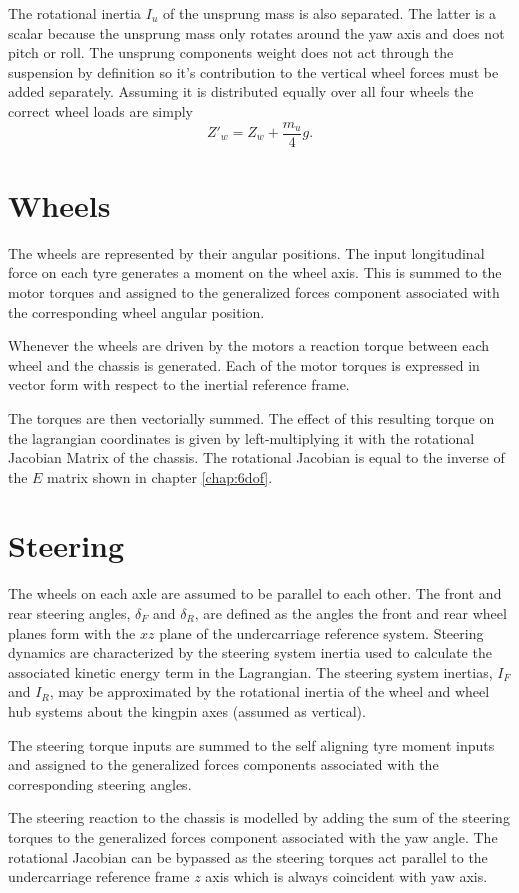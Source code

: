 The rotational inertia $I_u$ of the unsprung mass is also separated. The latter is a scalar because the unsprung mass only rotates around the yaw axis and does not pitch or roll.
The unsprung components weight does not act through the suspension by definition so it's contribution to the vertical wheel forces must be added separately. Assuming it is distributed equally over all four wheels the correct wheel loads are simply
$$Z'_w = Z_w + \frac{m_u}{4}g.$$

\section{Wheels}
\label{sec:wheels}
The wheels are represented by their angular positions.
The input longitudinal force on each tyre generates a moment on the wheel axis. This is summed to the motor torques and assigned to the generalized forces component associated with the corresponding wheel angular position.

Whenever the wheels are driven by the motors a reaction torque between each wheel and the chassis is generated. Each of the motor torques is expressed in vector form with respect to the inertial reference frame.

The torques are then vectorially summed. The effect of this resulting torque on the lagrangian coordinates is given by left-multiplying it with the rotational Jacobian Matrix of the chassis. The rotational Jacobian is equal to the inverse of the $E$ matrix shown in chapter \ref{chap:6dof}.

\section{Steering}
\label{sec:steering}
The wheels on each axle are assumed to be parallel to each other. The front and rear steering angles, $\delta_F$ and $\delta_R$, are defined as the angles the front and rear wheel planes form with the $xz$ plane of the undercarriage reference system.
Steering dynamics are characterized by the steering system inertia used to calculate the associated kinetic energy term in the Lagrangian.
The steering system inertias, $I_F$ and $I_R$, may be approximated by the rotational inertia of the wheel and wheel hub systems about the kingpin axes (assumed as vertical).

The steering torque inputs are summed to the self aligning tyre moment inputs and assigned to the generalized forces components associated with the corresponding steering angles.

The steering reaction to the chassis is modelled by adding the sum of the steering torques to the generalized forces component associated with the yaw angle. The rotational Jacobian can be bypassed as the steering torques act parallel to the undercarriage reference frame $z$ axis which is always coincident with yaw axis.
